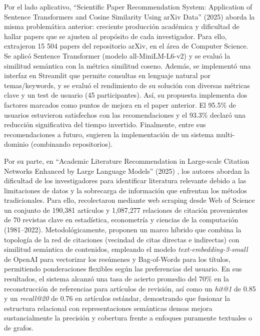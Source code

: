 \documentclass[conference]{IEEEtran}
\begin{document}
Por el lado aplicativo, ``Scientific Paper Recommendation System: Application of Sentence Transformers and Cosine Similarity Using arXiv Data'' (2025) \cite{b3} aborda la misma problemática anterior: creciente producción académica y dificultad de hallar papers que se ajusten al propósito de cada investigador. Para ello, extrajeron 15 504 papers del repositorio arXiv, en el área de Computer Science. Se aplicó Sentence Transformer (modelo all-MiniLM-L6-v2) y se evaluó la similitud semántica con la métrica similitud coseno. Además, se implementó una interfaz en Streamlit que permite consultas en lenguaje natural por temas/keywords, y se evaluó el rendimiento de su solución con diversas métricas clave y un test de usuario (45 participantes). Así, su propuesta implementa dos factores marcados como puntos de mejora en el paper anterior. El 95.5\% de usuarios estuvieron satisfechos con las recomendaciones y el 93.3\% declaró una reducción significativa del tiempo invertido. Finalmente, entre sus recomendaciones a futuro, sugieren la implementación de un sistema multi-dominio (combinando repositorios).

Por su parte, en ``Academic Literature Recommendation in Large-scale Citation Networks Enhanced by Large Language Models'' (2025) \cite{liu2025llm}, los autores abordan la dificultad de los investigadores para identificar literatura relevante debido a las limitaciones de datos y la sobrecarga de información que enfrentan los métodos tradicionales. Para ello, recolectaron mediante web scraping desde Web of Science un conjunto de 190,381 artículos y 1,087,277 relaciones de citación provenientes de 70 revistas clave en estadística, econometría y ciencias de la computación (1981--2022). Metodológicamente, proponen un marco híbrido que combina la topología de la red de citaciones (vecindad de citas directas e indirectas) con similitud semántica de contenidos, empleando el modelo \textit{text-embedding-3-small} de OpenAI para vectorizar los resúmenes y Bag-of-Words para los títulos, permitiendo ponderaciones flexibles según las preferencias del usuario. En sus resultados, el sistema alcanzó una tasa de acierto promedio del 70\% en la reconstrucción de referencias para artículos de revisión, así como un \textit{hit@1} de 0.85 y un \textit{recall@20} de 0.76 en artículos estándar, demostrando que fusionar la estructura relacional con representaciones semánticas densas mejora sustancialmente la precisión y cobertura frente a enfoques puramente textuales o de grafos.
\end{document}
